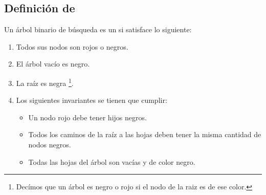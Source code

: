 \subsection{Definici\'on de {\arns}}
Un \'arbol binario de búsqueda es un {\arn} si satisface lo siguiente:
\begin{enumerate}
    \item Todos sus nodos son rojos o negros.
    \item El \'arbol vac\'io es negro.
    \item La ra\'iz es negra \footnote{Dec\'imos que un \'arbol es negro o rojo si el nodo de la
    raiz es de ese color.}.
    \item Los siguientes invariantes se tienen que cumplir:
    \begin{itemize}
        \item Un nodo rojo debe tener hijos negros.
        \item Todos los caminos de la raíz a las hojas deben tener la misma cantidad de nodos
        negros.
        \item Todas las hojas del \'arbol son vacías y de color negro.
    \end{itemize}
\end{enumerate}

\begin{figure}
\centering
\captionsetup{justification=centering}
\caption {\Arn}
\label{arbolRB_1}
\end{figure}

